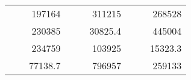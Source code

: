 \begin{table}[H]
\begin{tabular}{|ccrccrccc}
\rowcolor[HTML]{DAE8FC} 
\multicolumn{1}{|c|}{\cellcolor[HTML]{FFFFC7}}                                & \multicolumn{1}{c|}{\cellcolor[HTML]{DAE8FC}}                      & \multicolumn{1}{r|}{\cellcolor[HTML]{DAE8FC}197164}    & \multicolumn{1}{c|}{\cellcolor[HTML]{FFFFC7}}                                & \multicolumn{1}{c|}{\cellcolor[HTML]{DAE8FC}}                       & \multicolumn{1}{r|}{\cellcolor[HTML]{DAE8FC}311215}    & \multicolumn{1}{c|}{\cellcolor[HTML]{FFFFC7}}                                & \multicolumn{1}{c|}{\cellcolor[HTML]{DAE8FC}}                      & \multicolumn{1}{r|}{\cellcolor[HTML]{DAE8FC}268528}    \\ \cline{3-3} \cline{6-6} \cline{9-9} 
\multicolumn{1}{|c|}{\cellcolor[HTML]{FFFFC7}}                                & \multicolumn{1}{c|}{\cellcolor[HTML]{DAE8FC}}                      & \multicolumn{1}{r|}{\cellcolor[HTML]{DDFDFF}230385}    & \multicolumn{1}{c|}{\cellcolor[HTML]{FFFFC7}}                                & \multicolumn{1}{c|}{\cellcolor[HTML]{DAE8FC}}                       & \multicolumn{1}{r|}{\cellcolor[HTML]{DDFDFF}30825.4}   & \multicolumn{1}{c|}{\cellcolor[HTML]{FFFFC7}}                                & \multicolumn{1}{c|}{\cellcolor[HTML]{DAE8FC}}                      & \multicolumn{1}{r|}{\cellcolor[HTML]{DDFDFF}445004}    \\ \cline{3-3} \cline{6-6} \cline{9-9} 
\rowcolor[HTML]{DAE8FC} 
\multicolumn{1}{|c|}{\cellcolor[HTML]{FFFFC7}}                                & \multicolumn{1}{c|}{\cellcolor[HTML]{DAE8FC}}                      & \multicolumn{1}{r|}{\cellcolor[HTML]{DAE8FC}234759}    & \multicolumn{1}{c|}{\cellcolor[HTML]{FFFFC7}}                                & \multicolumn{1}{c|}{\cellcolor[HTML]{DAE8FC}}                       & \multicolumn{1}{r|}{\cellcolor[HTML]{DAE8FC}103925}    & \multicolumn{1}{c|}{\cellcolor[HTML]{FFFFC7}}                                & \multicolumn{1}{c|}{\cellcolor[HTML]{DAE8FC}}                      & \multicolumn{1}{r|}{\cellcolor[HTML]{DAE8FC}15323.3}   \\ \cline{3-3} \cline{6-6} \cline{9-9} 
\multicolumn{1}{|c|}{\cellcolor[HTML]{FFFFC7}}                                & \multicolumn{1}{c|}{\cellcolor[HTML]{DAE8FC}}                      & \multicolumn{1}{r|}{\cellcolor[HTML]{DDFDFF}77138.7}   & \multicolumn{1}{c|}{\cellcolor[HTML]{FFFFC7}}                                & \multicolumn{1}{c|}{\cellcolor[HTML]{DAE8FC}}                       & \multicolumn{1}{r|}{\cellcolor[HTML]{DDFDFF}796957}    & \multicolumn{1}{c|}{\cellcolor[HTML]{FFFFC7}}                                & \multicolumn{1}{c|}{\cellcolor[HTML]{DAE8FC}}                      & \multicolumn{1}{r|}{\cellcolor[HTML]{DDFDFF}259133}    \\ \cline{3-3} \cline{6-6} \cline{9-9} 

\end{tabular}
\end{table}
